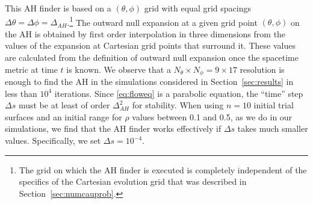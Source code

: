 \documentclass[a4paper,11pt]{article}
\numberwithin{equation}{section}
\begin{document}
This AH finder is based on a $(\theta,\phi)$ grid with equal grid spacings $\Delta \theta=\Delta\phi=\Delta_{AH}$.\footnote{The grid on which the AH finder is executed is completely independent of the specifics of the Cartesian evolution grid that was described in Section~\ref{sec:numcauprob}.} The outward null expansion at a given grid point $(\theta,\phi)$ on the AH is obtained by first order interpolation in three dimensions from the values of the expansion at Cartesian grid points that surround it. These values are calculated from the definition of outward null expansion once the spacetime metric at time $t$ is known.
We observe that a $N_\theta\times N_\phi=9\times 17$ resolution is enough to find the AH in the simulations considered in Section~\ref{sec:results} in less than $10^{4}$ iterations. Since \eqref{eq:floweq} is a parabolic equation, the ``time'' step $\Delta s$ must be at least of order $\Delta_{AH}^2$ for stability. When using $n=10$ initial trial surfaces and an initial range for $\rho$ values between 0.1 and 0.5, as we do in our simulations, we find that the AH finder works effectively if $\Delta s$ takes much smaller values. Specifically, we set $\Delta s=10^{-4}$.
\end{document}
